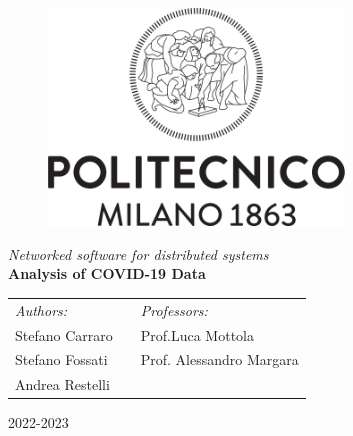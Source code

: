 \begin{titlepage}
\begin{center}
		\begin{figure}[ht]
			\centering\includegraphics[width=0.7\textwidth]{resources/Logo_Politecnico_Milano.png}
		\end{figure}
        
        \vspace{3.5cm}

        \LARGE
        \textit{Networked software for distributed systems}\\

        \vspace{0.5cm}
        \Large
        \textbf{Analysis of COVID-19 Data}
        
        \vspace{\fill}
  
		\large
		\begin{tabularx}{\linewidth}{@{}lXl@{}}
			\textit{Authors:}  & & \textit{Professors:} \\
			Stefano Carraro      & & Prof.\@ Luca Mottola\\
			Stefano Fossati  & & Prof. Alessandro Margara \\
			Andrea Restelli & & \\
		\end{tabularx}		
		\thispagestyle{empty}

        \vspace{1cm}

        2022-2023
           
\end{center}
\end{titlepage}